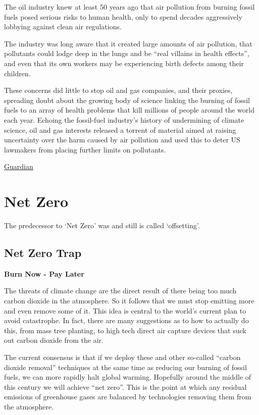 \documentclass[
]{book}
\begin{document}
The oil industry knew at least 50 years ago that air pollution from burning fossil fuels posed serious risks to human health, only to spend decades aggressively lobbying against clean air regulations.

The industry was long aware that it created large amounts of air pollution, that pollutants could lodge deep in the lungs and be ``real villains in health effects'', and even that its own workers may be experiencing birth defects among their children.

These concerns did little to stop oil and gas companies, and their proxies, spreading doubt about the growing body of science linking the burning of fossil fuels to an array of health problems that kill millions of people around the world each year. Echoing the fossil-fuel industry's history of undermining of climate science, oil and gas interests released a torrent of material aimed at raising uncertainty over the harm caused by air pollution and used this to deter US lawmakers from placing further limits on pollutants.

\href{https://www.theguardian.com/environment/2021/mar/18/oil-industry-fossil-fuels-air-pollution-documents}{Guardian}

\hypertarget{net-zero-1}{%
\chapter{Net Zero}\label{net-zero-1}}

The predecessor to `Net Zero' was and still is called `offsetting'.

\hypertarget{net-zero-trap}{%
\section{Net Zero Trap}\label{net-zero-trap}}

\textbf{Burn Now - Pay Later}

The threats of climate change are the direct result of there being too much carbon dioxide in the atmosphere. So it follows that we must stop emitting more and even remove some of it. This idea is central to the world's current plan to avoid catastrophe. In fact, there are many suggestions as to how to actually do this, from mass tree planting, to high tech direct air capture devices that suck out carbon dioxide from the air.

The current consensus is that if we deploy these and other so-called ``carbon dioxide removal'' techniques at the same time as reducing our burning of fossil fuels, we can more rapidly halt global warming. Hopefully around the middle of this century we will achieve ``net zero''. This is the point at which any residual emissions of greenhouse gases are balanced by technologies removing them from the atmosphere.
\end{document}
